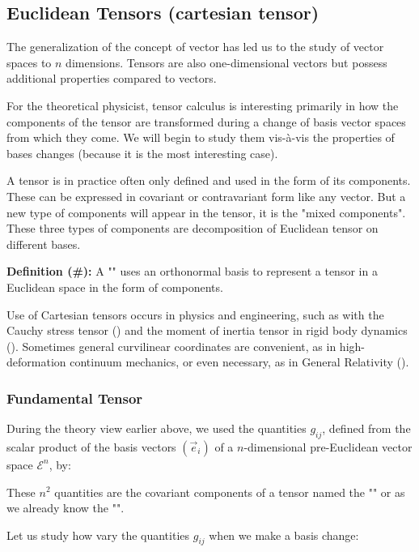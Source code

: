 	\subsection{Euclidean Tensors (cartesian tensor)}
	The generalization of the concept of vector has led us to the study of vector spaces to $n$ dimensions. Tensors are also one-dimensional vectors but possess additional properties compared to vectors.

	For the theoretical physicist, tensor calculus is interesting primarily in how the components of the tensor are transformed during a change of basis vector spaces from which they come. We will begin to study them vis-à-vis the properties of bases changes (because it is the most interesting case).

	A tensor is in practice often only defined and used in the form of its components. These can be expressed in covariant or contravariant form like any vector. But a new type of components will appear in the tensor, it is the "mixed components". These three types of components are decomposition of Euclidean tensor on different bases.
	
	\textbf{Definition (\#\mydef):} A "" uses an orthonormal basis to represent a tensor in a Euclidean space in the form of components.

	Use of Cartesian tensors occurs in physics and engineering, such as with the Cauchy stress tensor () and the moment of inertia tensor in rigid body dynamics (). Sometimes general curvilinear coordinates are convenient, as in high-deformation continuum mechanics, or even necessary, as in General Relativity ().
	
	\subsubsection{Fundamental Tensor}
	During the theory view earlier above, we used the quantities $g_{ij}$, defined from the scalar product of the basis vectors $(\vec{e}_i)$ of a $n$-dimensional pre-Euclidean  vector space $\mathcal{E}^n$, by:
	
	These $n^2$ quantities are the covariant components of a tensor named the "" or as we already know the "".
	
	Let us study how vary the quantities $g_{ij}$ when we make a basis change:

